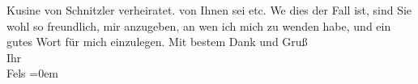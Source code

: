 \begin{ledgroupsized}[t]{13cm}
{{{                  Kusine von Schnitzler verheiratet.}}}\label{K_L00379-1h}
               von Ihnen sei etc. We{\geminationn} dies der Fall ist, sind Sie wohl
               so freundlich, mir anzugeben, an wen ich mich zu wenden habe, und ein gutes Wort für
               mich einzulegen.\pend
           \pstart
           Mit bestem Dank und Gruß{\\[\baselineskip]}Ihr{\\[\baselineskip]}\spacefill\mbox{Fels}\pend
           \leftskip=0em{}
         
         \endnumbering{}\end{ledgroupsized}  \newcommand{\dateiname}{L00379}\newcommand{\titel}{Friedrich M. Fels an Arthur Schnitzler, 7. 10. 1894}\newcommand{\editorInnen}{Martin Anton Müller und Gerd-Hermann Susen}
      